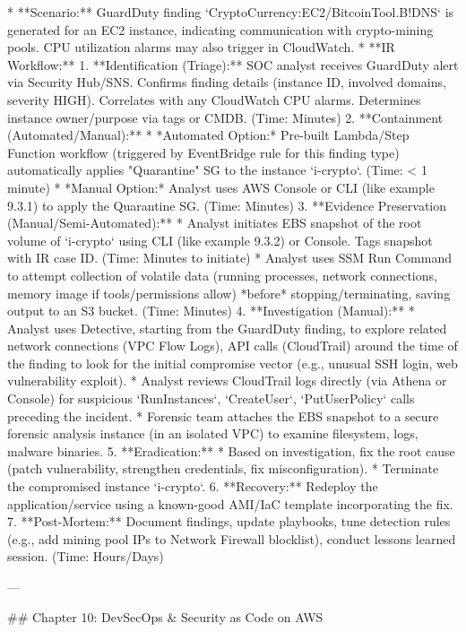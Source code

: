 \documentclass{article}
\begin{document}
* **Scenario:** GuardDuty finding `CryptoCurrency:EC2/BitcoinTool.B!DNS` is generated for an EC2 instance, indicating communication with crypto-mining pools. CPU utilization alarms may also trigger in CloudWatch.
* **IR Workflow:**
    1.  **Identification (Triage):** SOC analyst receives GuardDuty alert via Security Hub/SNS. Confirms finding details (instance ID, involved domains, severity HIGH). Correlates with any CloudWatch CPU alarms. Determines instance owner/purpose via tags or CMDB. (Time: Minutes)
    2.  **Containment (Automated/Manual):**
        * *Automated Option:* Pre-built Lambda/Step Function workflow (triggered by EventBridge rule for this finding type) automatically applies "Quarantine" SG to the instance `i-crypto`. (Time: < 1 minute)
        * *Manual Option:* Analyst uses AWS Console or CLI (like example 9.3.1) to apply the Quarantine SG. (Time: Minutes)
    3.  **Evidence Preservation (Manual/Semi-Automated):**
        * Analyst initiates EBS snapshot of the root volume of `i-crypto` using CLI (like example 9.3.2) or Console. Tags snapshot with IR case ID. (Time: Minutes to initiate)
        * Analyst uses SSM Run Command to attempt collection of volatile data (running processes, network connections, memory image if tools/permissions allow) *before* stopping/terminating, saving output to an S3 bucket. (Time: Minutes)
    4.  **Investigation (Manual):**
        * Analyst uses Detective, starting from the GuardDuty finding, to explore related network connections (VPC Flow Logs), API calls (CloudTrail) around the time of the finding to look for the initial compromise vector (e.g., unusual SSH login, web vulnerability exploit).
        * Analyst reviews CloudTrail logs directly (via Athena or Console) for suspicious `RunInstances`, `CreateUser`, `PutUserPolicy` calls preceding the incident.
        * Forensic team attaches the EBS snapshot to a secure forensic analysis instance (in an isolated VPC) to examine filesystem, logs, malware binaries.
    5.  **Eradication:**
        * Based on investigation, fix the root cause (patch vulnerability, strengthen credentials, fix misconfiguration).
        * Terminate the compromised instance `i-crypto`.
    6.  **Recovery:** Redeploy the application/service using a known-good AMI/IaC template incorporating the fix.
    7.  **Post-Mortem:** Document findings, update playbooks, tune detection rules (e.g., add mining pool IPs to Network Firewall blocklist), conduct lessons learned session. (Time: Hours/Days)

---

## Chapter 10: DevSecOps & Security as Code on AWS
\end{document}

